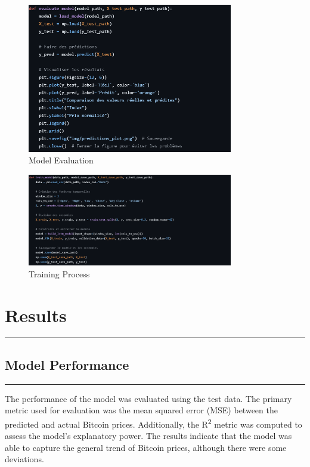 \documentclass{article}
\begin{document}
\begin{figure}[h]
    \centering
    \includegraphics[width=0.8\textwidth]{img/evaluation.png}
    \caption{Model Evaluation} %
    \label{fig:evaluation}
\end{figure}

\begin{figure}[h]
    \centering
    \includegraphics[width=0.8\textwidth]{img/capturenb1.png}
    \caption{Training Process} %
    \label{fig:training}
\end{figure}

\section{Results}
\noindent\rule{\textwidth}{1pt} %
\subsection{Model Performance}
\noindent\rule{\textwidth}{1pt} %
The performance of the model was evaluated using the test data. The primary metric used for evaluation was the mean squared error (MSE) between the predicted and actual Bitcoin prices. Additionally, the R\textsuperscript{2} metric was computed to assess the model's explanatory power. The results indicate that the model was able to capture the general trend of Bitcoin prices, although there were some deviations.
\end{document}
